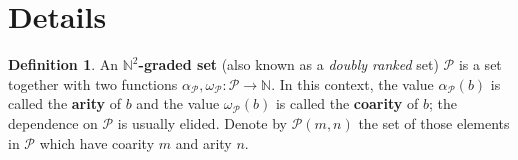 \documentclass{article}
\newcommand{\N}{\mathbb{N}}
\newcommand{\Fpil}{\longrightarrow}
\newcommand{\mc}{\mathcal}
\theoremstyle{definition}
\newtheorem{definition}{Definition}
\providecommand*{\DefOrd}[2][]{\textbf{#2}}
\providecommand*{\emDefOrd}[2][]{\emph{#2}}
\begin{document}
\section{Details}

\begin{definition}
  An \DefOrd{$\N^2$-graded set} (also known as a \emDefOrd{doubly 
  ranked} set) $\mc{P}$ is a set together with two 
  functions \(\alpha_{\mc{P}},\omega_{\mc{P}}\colon \mc{P} \Fpil \N\). 
  In this context, the value $\alpha_{\mc{P}}(b)$ is called the 
  \DefOrd{arity} of $b$ and the value $\omega_{\mc{P}}(b)$ is called 
  the \DefOrd{coarity} of $b$; the dependence on $\mc{P}$ is 
  usually elided. Denote by $\mc{P}(m,n)$ the set of those elements in 
  $\mc{P}$ which have coarity $m$ and arity $n$.
\end{definition}
\end{document}
